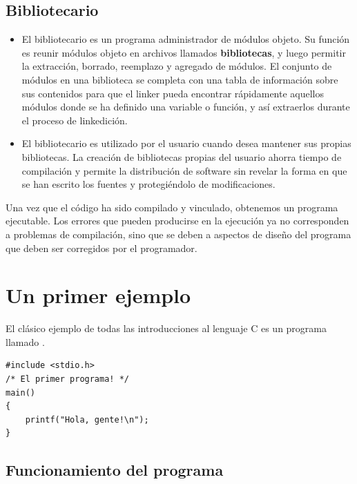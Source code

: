 \subsection{Bibliotecario}
\begin{itemize}
	\item El bibliotecario es un programa administrador de módulos objeto. Su función
es reunir módulos objeto en archivos llamados \textbf{bibliotecas}, y luego
permitir la extracción, borrado, reemplazo y agregado de módulos.
El conjunto de módulos en una biblioteca se completa con una tabla de
información sobre sus contenidos para que el linker pueda encontrar
rápidamente aquellos módulos donde se ha definido una variable o
función, y así extraerlos durante el proceso de linkedición. 
\item El bibliotecario es utilizado por el usuario cuando desea mantener sus
propias bibliotecas. La creación de bibliotecas propias del usuario
ahorra tiempo de compilación y permite la distribución de software
sin revelar la forma en que se han escrito los fuentes y
protegiéndolo de modificaciones. 
\end{itemize}

Una vez que el código ha sido compilado y vinculado, obtenemos un programa ejecutable. Los errores que pueden producirse en la ejecución ya no corresponden a problemas de compilación, sino que se deben a aspectos de diseño del programa que deben ser corregidos por el programador.

\section{Un primer ejemplo}

El clásico ejemplo de todas las introducciones al lenguaje C es un programa llamado .

\begin{lstlisting}
#include <stdio.h>
/* El primer programa! */
main()
{
	printf("Hola, gente!\n");
}
\end{lstlisting}

\subsection{Funcionamiento del programa}

